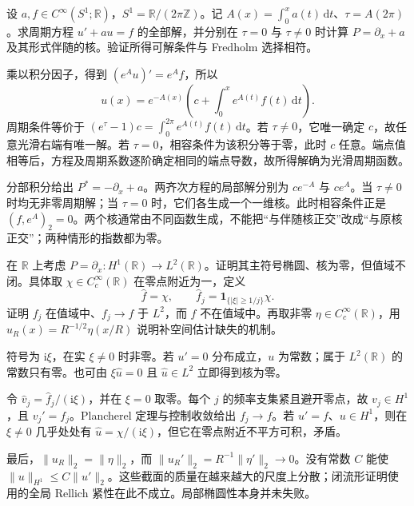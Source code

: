 \BookExercises

\begin{exercise}\label{g3:ex:periodic-drift-fredholm}
	设 \(a,f\in C^\infty(S^1;\mathbb R)\)，\(S^1=\mathbb R/(2\pi\mathbb Z)\)。记 \(A(x)=\int_0^x a(t)\,\mathrm dt\)、\(\tau=A(2\pi)\)。求周期方程 \(u'+au=f\) 的全部解，并分别在 \(\tau=0\) 与 \(\tau\ne0\) 时计算 \(P=\partial_x+a\) 及其形式伴随的核。验证所得可解条件与 Fredholm 选择相符。
\end{exercise}
\begin{solution}
	乘以积分因子，得到 \((e^Au)'=e^Af\)，所以
	\[
		u(x)=e^{-A(x)}\left(c+\int_0^x e^{A(t)}f(t)\,\mathrm dt\right).
	\]
	周期条件等价于
	\((e^\tau-1)c=\int_0^{2\pi}e^{A(t)}f(t)\,\mathrm dt\)。若 \(\tau\ne0\)，它唯一确定 \(c\)，故任意光滑右端有唯一解。若 \(\tau=0\)，相容条件为该积分等于零，此时 \(c\) 任意。端点值相等后，方程及周期系数逐阶确定相同的端点导数，故所得解确为光滑周期函数。

	分部积分给出 \(P^*=-\partial_x+a\)。两齐次方程的局部解分别为 \(c e^{-A}\) 与 \(c e^A\)。当 \(\tau\ne0\) 时均无非零周期解；当 \(\tau=0\) 时，它们各生成一个一维核。此时相容条件正是 \((f,e^A)_2=0\)。两个核通常由不同函数生成，不能把“与伴随核正交”改成“与原核正交”；两种情形的指数都为零。
\end{solution}

\begin{exercise}\label{g3:ex:noncompact-derivative-range}
	在 \(\mathbb R\) 上考虑 \(P=\partial_x:H^1(\mathbb R)\to L^2(\mathbb R)\)。证明其主符号椭圆、核为零，但值域不闭。具体取 \(\chi\in C_c^\infty(\mathbb R)\) 在零点附近为一，定义
	\[
		\widehat f=\chi,\qquad
		\widehat f_j=\mathbf1_{\{|\xi|\ge1/j\}}\chi.
	\]
	证明 \(f_j\) 在值域中、\(f_j\to f\) 于 \(L^2\)，而 \(f\) 不在值域中。再取非零 \(\eta\in C_c^\infty(\mathbb R)\)，用 \(u_R(x)=R^{-1/2}\eta(x/R)\) 说明补空间估计缺失的机制。
\end{exercise}
\begin{solution}
	符号为 \(\mathrm i\xi\)，在实 \(\xi\ne0\) 时非零。若 \(u'=0\) 分布成立，\(u\) 为常数；属于 \(L^2(\mathbb R)\) 的常数只有零。也可由 \(\xi\widehat u=0\) 且 \(\widehat u\in L^2\) 立即得到核为零。

	令 \(\widehat v_j=\widehat f_j/(\mathrm i\xi)\)，并在 \(\xi=0\) 取零。每个 \(j\) 的频率支集紧且避开零点，故 \(v_j\in H^1\)，且 \(v_j'=f_j\)。Plancherel 定理与控制收敛给出 \(f_j\to f\)。若 \(u'=f\)、\(u\in H^1\)，则在 \(\xi\ne0\) 几乎处处有 \(\widehat u=\chi/(\mathrm i\xi)\)，但它在零点附近不平方可积，矛盾。

	最后，\(\|u_R\|_2=\|\eta\|_2\)，而 \(\|u_R'\|_2=R^{-1}\|\eta'\|_2\to0\)。没有常数 \(C\) 能使 \(\|u\|_{H^1}\le C\|u'\|_2\)。这些截面的质量在越来越大的尺度上分散；闭流形证明使用的全局 Rellich 紧性在此不成立。局部椭圆性本身并未失败。
\end{solution}

